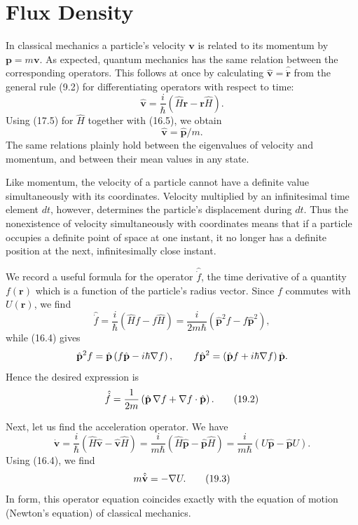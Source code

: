 \section{Flux Density}

In classical mechanics a particle's velocity $\mathbf v$ is related to its
momentum by $\mathbf p=m\mathbf v$. As expected, quantum mechanics has the
same relation between the corresponding operators. This follows at once by
calculating $\hat{\mathbf v}=\hat{\dot{\mathbf r}}$ from the general rule
(9.2) for differentiating operators with respect to time:
\[
  \hat{\mathbf v}=\frac{i}{\hbar}
  \left(\hat H\mathbf r-\mathbf r\hat H\right).
\]
Using (17.5) for $\hat H$ together with (16.5),%
we obtain
\begin{equation}
  \hat{\mathbf v}=\hat{\mathbf p}/m.
  \tag{19.1}
\end{equation}
The same relations plainly hold between the eigenvalues of velocity and
momentum, and between their mean values in any state.

Like momentum, the velocity of a particle cannot have a definite value
simultaneously with its coordinates. Velocity multiplied by an infinitesimal
time element $dt$, however, determines the particle's displacement during
$dt$. Thus the nonexistence of velocity simultaneously with coordinates means
that if a particle occupies a definite point of space at one instant, it no
longer has a definite position at the next, infinitesimally close instant.

We record a useful formula for the operator $\hat{\dot f}$, the time
derivative of a quantity $f(\mathbf r)$ which is a function of the particle's
radius vector. Since $f$ commutes with $U(\mathbf r)$, we find
\[
  \hat{\dot f}=\frac{i}{\hbar}(\hat Hf-f\hat H)
  =\frac{i}{2m\hbar}(\hat{\mathbf p}^{2}f-f\hat{\mathbf p}^{2}),
\]
while (16.4) gives
\[
  \hat{\mathbf p}^{2}f
  =\hat{\mathbf p}\left(f\hat{\mathbf p}-i\hbar\nabla f\right),
  \qquad
  f\hat{\mathbf p}^{2}
  =\left(\hat{\mathbf p}f+i\hbar\nabla f\right)\hat{\mathbf p}.
\]
Hence the desired expression is
\begin{equation}
  \hat{\dot f}=\frac{1}{2m}
  \left(\hat{\mathbf p}\,\nabla f+\nabla f\cdot\hat{\mathbf p}\right).
  \tag{19.2}
\end{equation}

Next, let us find the acceleration operator. We have
\[
  \hat{\dot{\mathbf v}}
  =\frac{i}{\hbar}(\hat H\hat{\mathbf v}-\hat{\mathbf v}\hat H)
  =\frac{i}{m\hbar}(\hat H\hat{\mathbf p}-\hat{\mathbf p}\hat H)
  =\frac{i}{m\hbar}(U\hat{\mathbf p}-\hat{\mathbf p}U).
\]
Using (16.4), we find
\begin{equation}
  m\hat{\dot{\mathbf v}}=-\nabla U.
  \tag{19.3}
\end{equation}
In form, this operator equation coincides exactly with the equation of motion
(Newton's equation) of classical mechanics.

